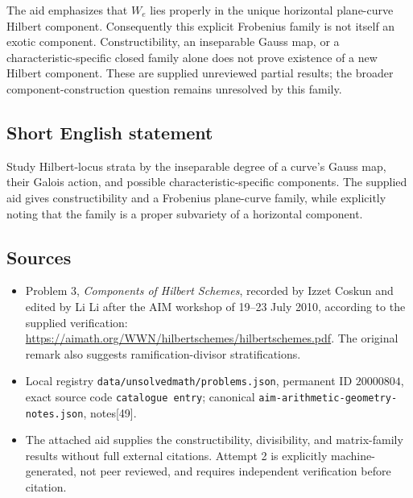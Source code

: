 \documentclass[11pt]{article}
\begin{document}
The aid emphasizes that \(W_e\) lies properly in the unique horizontal plane-curve Hilbert component. Consequently this explicit Frobenius family is not itself an exotic component. Constructibility, an inseparable Gauss map, or a characteristic-specific closed family alone does not prove existence of a new Hilbert component. These are supplied unreviewed partial results; the broader component-construction question remains unresolved by this family.
\subsection{Short English statement}
Study Hilbert-locus strata by the inseparable degree of a curve's Gauss map, their Galois action, and possible characteristic-specific components. The supplied aid gives constructibility and a Frobenius plane-curve family, while explicitly noting that the family is a proper subvariety of a horizontal component.
\subsection{Sources}
\begin{itemize}
\item Problem 3, \emph{Components of Hilbert Schemes}, recorded by Izzet Coskun and edited by Li Li after the AIM workshop of 19--23 July 2010, according to the supplied verification: \url{https://aimath.org/WWN/hilbertschemes/hilbertschemes.pdf}. The original remark also suggests ramification-divisor stratifications.
\item Local registry \texttt{data/unsolvedmath/problems.json}, permanent ID \(20000804\), exact source code \texttt{catalogue entry}; canonical \texttt{aim-arithmetic-geometry-notes.json}, notes[49].
\item The attached aid supplies the constructibility, divisibility, and matrix-family results without full external citations. Attempt 2 is explicitly machine-generated, not peer reviewed, and requires independent verification before citation.
\end{itemize}
\end{document}
